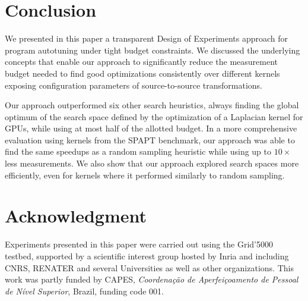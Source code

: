 \documentclass[conference]{IEEEtran}
\begin{document}
\section{Conclusion}
\label{sec:orgf19c201}
We presented in this paper a transparent Design of Experiments approach for
program autotuning under tight budget constraints. We discussed the underlying
concepts that enable our approach to significantly reduce the measurement budget
needed to find good optimizations consistently over different kernels exposing
configuration parameters of source-to-source transformations.

Our approach outperformed six other search heuristics, always finding the global
optimum of the search space defined by the optimization of a Laplacian kernel
for GPUs, while using at most half of the allotted budget. In a more
comprehensive evaluation using kernels from the SPAPT benchmark, our approach
was able to find the same speedups as a random sampling heuristic while using up
to \(10\times\) less measurements. We also show that our approach explored search
spaces more efficiently, even for kernels where it performed similarly to random
sampling.
\section*{Acknowledgment}
\label{sec:org4b1b3f8}
Experiments presented in this paper were carried out using the Grid'5000
testbed, supported by a scientific interest group hosted by Inria and including
CNRS, RENATER and several Universities as well as other organizations.
This work was partly funded by CAPES, \emph{Coordenação de Aperfeiçoamento de Pessoal
de Nível Superior}, Brazil, funding code 001.


\end{document}
